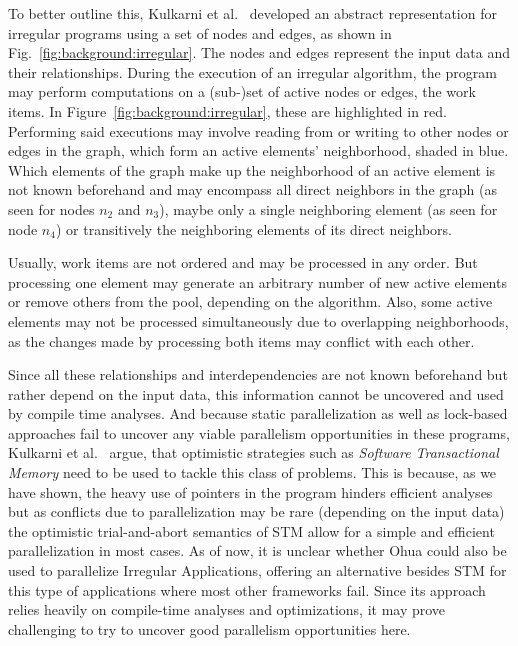 To better outline this, Kulkarni et al.~\cite{kulkarni2009much} developed an abstract representation for irregular programs using a set of nodes and edges, as shown in Fig.~\ref{fig:background:irregular}.
The nodes and edges represent the input data and their relationships.
During the execution of an irregular algorithm, the program may perform computations on a (sub-)set of active nodes or edges, the work items.
In Figure~\ref{fig:background:irregular}, these are highlighted in red.
Performing said executions may involve reading from or writing to other nodes or edges in the graph, which form an active elements' neighborhood, shaded in blue.
Which elements of the graph make up the neighborhood of an active element is not known beforehand and may encompass all direct neighbors in the graph (as seen for nodes $n_2$ and $n_3$), maybe only a single neighboring element (as seen for node $n_4$) or transitively the neighboring elements of its direct neighbors.

Usually, work items are not ordered and may be processed in any order.
But processing one element may generate an arbitrary number of new active elements or remove others from the pool, depending on the algorithm.
Also, some active elements may not be processed simultaneously due to overlapping neighborhoods, as the changes made by processing both items may conflict with each other.

Since all these relationships and interdependencies are not known beforehand but rather depend on the input data, this information cannot be uncovered and used by compile time analyses.
And because static parallelization as well as lock-based approaches fail to uncover any viable parallelism opportunities in these programs, Kulkarni et al.~\cite{kulkarni2007optimistic} argue, that optimistic strategies such as \emph{Software Transactional Memory} need to be used to tackle this class of problems.
This is because, as we have shown, the heavy use of pointers in the program hinders efficient analyses but as conflicts due to parallelization may be rare (depending on the input data) the optimistic trial-and-abort semantics of STM allow for a simple and efficient parallelization in most cases.
As of now, it is unclear whether Ohua could also be used to parallelize Irregular Applications, offering an alternative besides STM for this type of applications where most other frameworks fail.
Since its approach relies heavily on compile-time analyses and optimizations, it may prove challenging to try to uncover good parallelism opportunities here.


